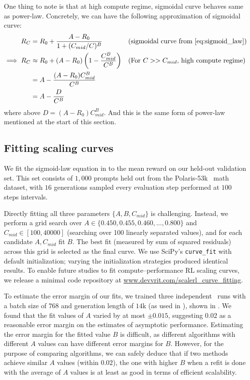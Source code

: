 One thing to note is that at high compute regime, sigmoidal curve behaves same as power-law. Concretely, we can have the following approximation of sigmoidal curve:
\begin{align*}
    R_C &= R_0 + \frac{A-R_0}{1 + (C_{mid}/C)^B} && \text{(sigmoidal curve from \cref{eq:sigmoid_law})} \\
    \implies R_C &\approx R_0 + (A-R_0)\left(1-\frac{C_{mid}^B}{C^B}\right) && \text{(For $C >> C_{mid}$, high compute regime)}\\
    &= A - \frac{(A-R_0)C_{mid}^B}{C^B}\\
    &= A - \frac{D}{C^B}
\end{align*}
where above $D = (A-R_0)C_{mid}^B$. And this is the same form of power-law mentioned at the start of this section.

\subsection{Fitting scaling curves} \label{appendix:fitting_curves}
We fit the sigmoid-law equation in  to the mean reward on our held-out validation set. 
This set consists of $1,000$ prompts held out from the Polaris-53k~\citep{polaris2025} math dataset, with $16$ generations sampled every evaluation step performed at $100$ steps intervals. 

Directly fitting all three parameters $\{A,B,C_{mid}\}$ is challenging. 
Instead, we perform a grid search over $A \in \{0.450, 0.455, 0.460, \ldots, 0.800\}$ and $C_{mid}\in [100, 40000]$ (searching over 100 linearly separated values), and for each candidate $A, C_{mid}$ fit $B$. 
The best fit (measured by sum of squared residuals) across this grid is selected as the final curve. 
We use SciPy’s \texttt{curve\_fit} with default initialization; varying the initialization strategies produced identical results. To enable future studies to fit compute–performance RL scaling curves, we release a minimal code repository at \href{https://www.devvrit.com/scalerl_curve_fitting}{www.devvrit.com/scalerl\_curve\_fitting}.

To estimate the error margin of our fits, we trained three independent \scalerl\ runs with a batch size of $768$ and generation length of $14\text{k}$ (as used in ), shown in . 
We found that the fit values of $A$ varied by at most $\pm 0.015$, suggesting $0.02$ as a reasonable error margin on the estimates of asymptotic performance. Estimating the error margin for the fitted value $B$ is difficult, as different algorithms with different $A$ values can have different error margins for $B$. However, for the purpose of comparing algorithms, we can safely deduce that if two methods achieve similar $A$ values (within $0.02$), the one with higher $B$ when a refit is done with the average of $A$ values is at least as good in terms of efficient scalability.

